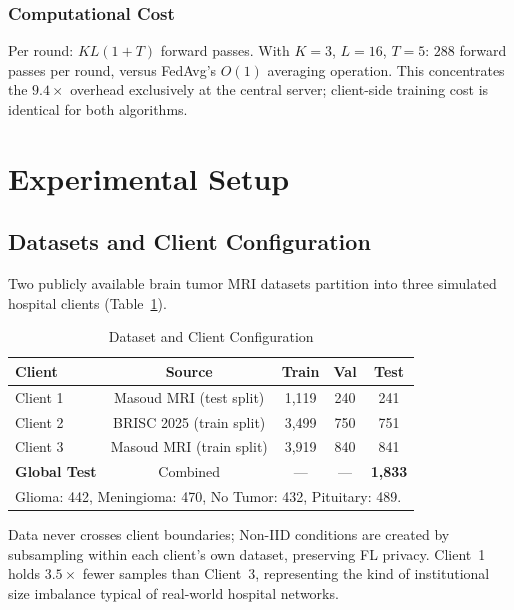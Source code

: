 \documentclass[conference]{IEEEtran}
\begin{document}
\subsubsection{Computational Cost}
Per round: $KL(1+T)$ forward passes. With $K=3$, $L=16$, $T=5$: $288$
forward passes per round, versus FedAvg's $O(1)$ averaging operation.
This concentrates the $9.4\times$ overhead exclusively at the central server;
client-side training cost is identical for both algorithms.

\section{Experimental Setup}
\label{sec:setup}

\subsection{Datasets and Client Configuration}
Two publicly available brain tumor MRI datasets partition into three
simulated hospital clients (Table~\ref{tab:clients}).

\begin{table}[htbp]
\caption{Dataset and Client Configuration}
\label{tab:clients}
\begin{center}
\begin{tabular}{lcccc}
\hline
\textbf{Client} & \textbf{Source} & \textbf{Train} & \textbf{Val} &
\textbf{Test}\\
\hline
Client 1 & Masoud MRI \cite{masoud} (test split)  & 1,119 & 240 & 241\\
Client 2 & BRISC 2025 \cite{brisc} (train split)  & 3,499 & 750 & 751\\
Client 3 & Masoud MRI \cite{masoud} (train split) & 3,919 & 840 & 841\\
\hline
\textbf{Global Test} & Combined & --- & --- & \textbf{1,833}\\
\hline
\multicolumn{5}{l}{\small Glioma: 442, Meningioma: 470, No Tumor: 432,
Pituitary: 489.}
\end{tabular}
\end{center}
\end{table}

Data never crosses client boundaries; Non-IID conditions are created by
subsampling within each client's own dataset, preserving FL privacy.
Client~1 holds $3.5\times$ fewer samples than Client~3, representing the
kind of institutional size imbalance typical of real-world hospital networks.
\end{document}
